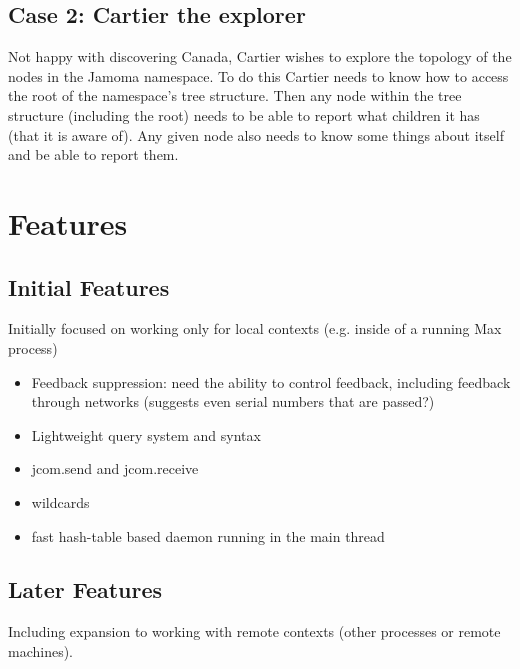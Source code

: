 \documentclass[]{article}
\begin{document}
\subsection{Case 2: Cartier the explorer}

Not happy with discovering Canada, Cartier wishes to explore the topology of the nodes in the Jamoma namespace.  To do this Cartier needs to know how to access the root of the namespace's tree structure.  Then any node within the tree structure (including the root) needs to be able to report what children it has (that it is aware of).  Any given node also needs to know some things about itself and be able to report them.



\section{Features}

\subsection{Initial Features}

Initially focused on working only for local contexts (e.g. inside of a running Max process)

\begin{itemize}
	
	\item Feedback suppression: need the ability to control feedback, including feedback through networks (suggests even serial numbers that are passed?)

	\item Lightweight query system and syntax

	\item jcom.send and jcom.receive

	\item wildcards

	\item fast hash-table based daemon running in the main thread

\end{itemize}


\subsection{Later Features}

Including expansion to working with remote contexts (other processes or remote machines). 
\end{document}
